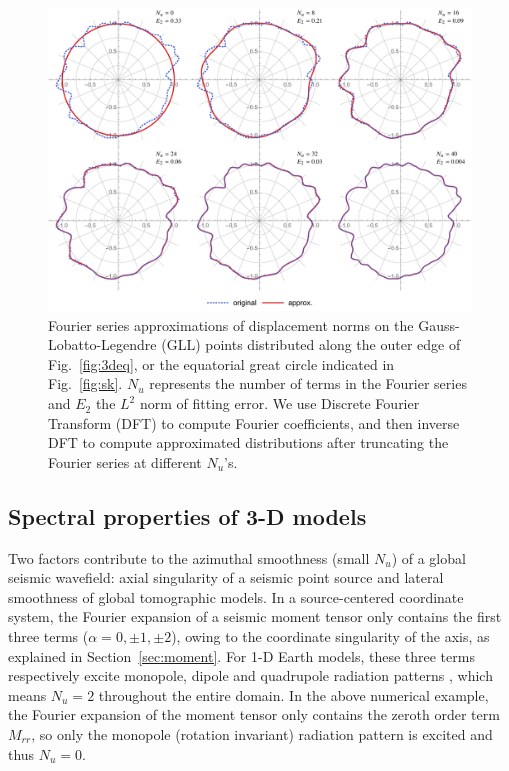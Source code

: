 \documentclass[extra]{gji}
\begin{document}
\begin{figure}
  \centering
  \includegraphics[width=.9\textwidth]{fig/equator/fourier.pdf}
  \caption{Fourier series approximations of displacement norms 
  on the Gauss-Lobatto-Legendre (GLL) points distributed along the outer edge of Fig.~\ref{fig:3deq},
  or the equatorial great circle indicated in Fig.~\ref{fig:sk}. 
  $N_u$ represents the number of terms in the Fourier series 
  and $E_2$ the $L^2$ norm of fitting error. We use  
  Discrete Fourier Transform (DFT) to compute Fourier coefficients, 
  and then inverse DFT to compute approximated distributions 
  after truncating the Fourier series at different $N_u$'s.} 
  \label{fig:four}
\end{figure}

\subsection{Spectral properties of 3-D models}
Two factors contribute to the azimuthal smoothness (small $N_u$) of 
a global seismic wavefield: axial singularity of a seismic point source 
and lateral smoothness of global tomographic models.  
In a source-centered coordinate system, the Fourier expansion 
of a seismic moment tensor only contains the first three terms 
($\alpha=0,\pm1,\pm2$), owing to the coordinate singularity 
of the axis, as explained in Section~\ref{sec:moment}.
For 1-D Earth models, these three terms respectively
excite monopole, dipole and quadrupole radiation patterns
\cite[]{nissen2007axisem, van2014seismic}, which means $N_u=2$ throughout 
the entire domain. In the above numerical example, the Fourier expansion of
the moment tensor only contains the zeroth order term $M_{rr}$, 
so only the monopole (rotation invariant) radiation pattern is excited 
and thus $N_u=0$.
\end{document}
